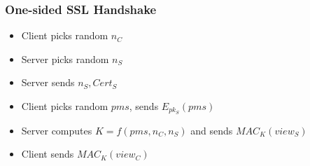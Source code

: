 \documentclass[14pt]{beamer}
\begin{document}
                \begin{frame} 
                    \frametitle{One-sided SSL Handshake}
                        \begin{itemize}
                            \item Client picks random $n_C$
                            \item Server picks random $n_S$
                            \item Server sends $n_S, Cert_S$
                            \item Client picks random $pms$, sends $E_{pk_S}(pms)$
                            \item Server computes $K = f(pms, n_C, n_S)$ and sends $MAC_K(view_S)$
                            \item Client sends $MAC_K(view_C)$
                        \end{itemize}
                \end{frame}
\end{document}
